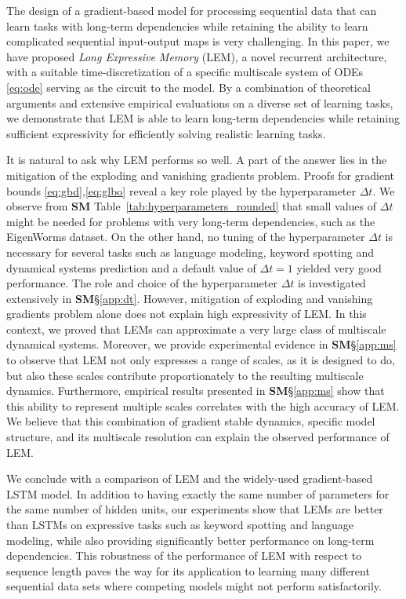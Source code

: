 \documentclass{article} \usepackage{iclr2022_conference,times}
\newcommand{\Dt}{{\Delta t}}
\newcommand{\Tref}[1]{Table~\ref{#1}}
\begin{document}
The design of a gradient-based model for processing sequential data that can learn tasks with long-term dependencies while retaining the ability to learn complicated sequential input-output maps is very challenging. 
In this paper, we have proposed \emph{Long Expressive Memory} (LEM), a novel recurrent architecture, with a suitable time-discretization of a specific multiscale system of ODEs \eqref{eq:ode} serving as the circuit to the model. By a combination of theoretical arguments and extensive empirical evaluations on a diverse set of learning tasks, we demonstrate that LEM is able to learn long-term dependencies while retaining sufficient expressivity for efficiently solving realistic learning tasks. 

It is natural to ask why LEM performs so well. A part of the answer lies in the mitigation of the exploding and vanishing gradients problem. Proofs for gradient bounds \eqref{eq:gbd},\eqref{eq:glbo} reveal a key role played by the hyperparameter $\Dt$. We observe from {\bf SM} \Tref{tab:hyperparameters_rounded} that small values of $\Dt$ might be needed for problems with very long-term dependencies, such as the EigenWorms dataset. On the other hand, no tuning of the hyperparameter $\Dt$ is necessary for several tasks such as language modeling, keyword spotting and dynamical systems prediction and a default value of $\Dt =1$ yielded very good performance. The role and choice of the hyperparameter $\Dt$ is investigated extensively in {\bf SM}\S\ref{app:dt}. However, mitigation of exploding and vanishing gradients problem alone does not explain high expressivity of LEM. In this context, we proved that LEMs can approximate a very large class of multiscale dynamical systems. Moreover, we provide experimental evidence in {\bf SM}\S\ref{app:ms} to observe that LEM not only expresses a range of scales, as it is designed to do, but also these scales contribute proportionately to the resulting multiscale dynamics. Furthermore, empirical results presented in {\bf SM}\S\ref{app:ms} show that this ability to represent multiple scales correlates with the high accuracy of LEM. We believe that this combination of gradient stable dynamics, specific model structure, and its multiscale resolution can explain the observed performance of LEM. 

We conclude with a comparison of LEM and the widely-used gradient-based LSTM model. 
In addition to having exactly the same number of parameters for the same number of hidden units, our experiments show that LEMs are better than LSTMs on expressive tasks such as keyword spotting and language modeling, while also providing significantly better performance on long-term dependencies. This robustness of the performance of LEM with respect to sequence length paves the way for its application to learning many different sequential data sets where competing models might not perform satisfactorily.
\end{document}
